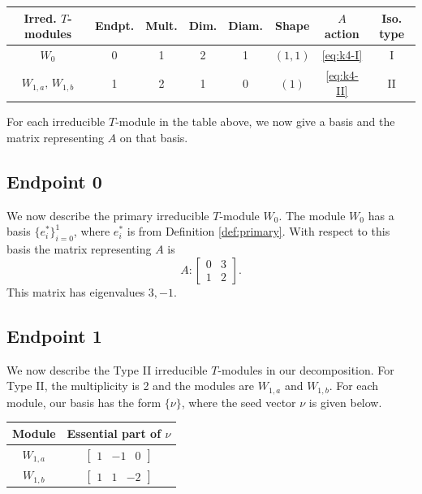 \documentclass[12pt,letterpaper]{article}
\newcommand{\rowvector}[1]{\begin{bmatrix} #1 \end{bmatrix}}
\begin{document}
\begin{center}
\begin{tabular}{c | c c c c c c c}
\toprule
\textbf{Irred. $T$-modules} & \textbf{Endpt.} & \textbf{Mult.} & \textbf{Dim.} & \textbf{Diam.} & \textbf{Shape} & $A$ \textbf{action} & \textbf{Iso. type} \\
\midrule
$W_0$          & 0 & 1 & 2 & 1 & $(1,1)$ & \eqref{eq:k4-I} & I \\
$W_{1,a},\, W_{1,b}$  & 1 & 2 & 1 & 0 & $(1)$ & \eqref{eq:k4-II} & II \\
\bottomrule
\end{tabular}

\smallskip
{}
\end{center}


For each irreducible $T$-module in the table above, we now give a basis and the matrix representing $A$ on that basis. 

\subsection{Endpoint 0}

We now describe the primary irreducible $T$-module $W_0$. The module $W_0$ has a basis $\{e_i^*\}_{i=0}^1$, where $e_i^*$ is from Definition \ref{def:primary}. With respect to this basis the matrix representing $A$ is
\begin{equation}
    A: \begin{bmatrix}
  0 & 3 \\
  1 & 2 
\end{bmatrix}.
\label{eq:k4-I}
\end{equation}
This matrix has eigenvalues $3, -1$.

\subsection{Endpoint 1}

We now describe the Type II irreducible $T$-modules in our decomposition. For Type II, the multiplicity is 2 and the modules are $W_{1,a}$ and $W_{1,b}$. For each module, our basis has the form $\{\nu\}$, where the seed vector $\nu$ is given below.
\begin{center}
    \begin{tabular}{c | c}
    \toprule
       \textbf{Module}  & \textbf{Essential part of }$\nu$\\
       \midrule
       $W_{1,a}$  & $\rowvector{1 & -1 & 0}$ \\[1.67pt]
       $W_{1,b}$  & $\rowvector{1 & 1 & -2}$ \\
    \bottomrule
    \end{tabular}
\end{center}
\end{document}
